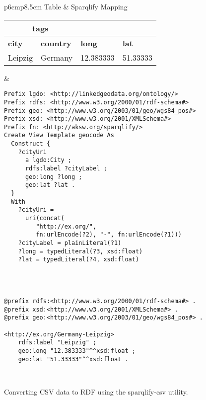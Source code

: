 \documentclass[a4paper,twoside,bibtotoc,abstracton,12pt,BCOR=15mm]{scrreprt}
\begin{document}
\begin{figure}[!h]
\centering
\begin{tabular}{p{6cm}p{8.5cm}}
\toprule
Table & Sparqlify Mapping \\ 
\midrule

\begin{scriptsize}
\begin{tabular}{|l|l|l|l|} \cline{1-2}
\multicolumn{2}{|c|}{tags} \\ \hline
\textbf{city} & \textbf{country} & \textbf{long} & \textbf{lat} \\ \hline
Leipzig & Germany & 12.383333 & 51.33333 \\ \hline
\end{tabular}
\end{scriptsize}

&

\begin{minipage}{8.5cm}
\begin{scriptsize}
\begin{verbatim}
Prefix lgdo: <http://linkedgeodata.org/ontology/>
Prefix rdfs: <http://www.w3.org/2000/01/rdf-schema#>
Prefix geo: <http://www.w3.org/2003/01/geo/wgs84_pos#>
Prefix xsd: <http://www.w3.org/2001/XMLSchema#>
Prefix fn: <http://aksw.org/sparqlify/>
Create View Template geocode As
  Construct {
    ?cityUri
      a lgdo:City ;
      rdfs:label ?cityLabel ;
      geo:long ?long ;
      geo:lat ?lat .
  }
  With
    ?cityUri =
      uri(concat(
         "http://ex.org/",
         fn:urlEncode(?2), "-", fn:urlEncode(?1)))
    ?cityLabel = plainLiteral(?1)
    ?long = typedLiteral(?3, xsd:float)
    ?lat = typedLiteral(?4, xsd:float)
\end{verbatim}
\end{scriptsize}
\end{minipage}


\\

 \\ \midrule
\begin{minipage}{\textwidth}
\begin{lstlisting}
@prefix rdfs:<http://www.w3.org/2000/01/rdf-schema#> .
@prefix xsd:<http://www.w3.org/2001/XMLSchema#> .
@prefix geo:<http://www.w3.org/2003/01/geo/wgs84_pos#> .

<http://ex.org/Germany-Leipzig>
    rdfs:label "Leipzig" ;
    geo:long "12.383333"^^xsd:float ;
    geo:lat "51.33333"^^xsd:float .
\end{lstlisting}
\end{minipage}

\\
\bottomrule
\end{tabular}
\caption{Converting CSV data to RDF using the sparqlify-csv utility.}
\label{fig:ex:sparqlify-csv}
\end{figure}
\end{document}
